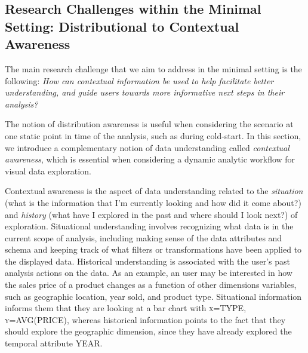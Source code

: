 \subsection{Research Challenges within the Minimal Setting: Distributional to Contextual Awareness}


\par The main research challenge that we aim to address in the minimal setting is the following: {\em How can contextual information be used to help facilitate better understanding, and guide users towards more informative next steps in their analysis?}

\par The notion of distribution awareness is useful when considering the scenario at one static point in time of the analysis, such as during cold-start. In this section, we introduce a complementary notion of data understanding called \textit{contextual awareness}, which is essential when considering a dynamic analytic workflow for visual data exploration.
\par Contextual awareness is the aspect of 
data understanding related to 
the \textit{situation} (what is the information 
that I'm currently looking and how did it come about?) 
and \textit{history} (what have I explored in the past 
and where should I look next?) of exploration. 
Situational understanding involves recognizing 
what data is in the current 
scope of analysis, 
including making sense of the data attributes 
and schema and keeping track of what filters or 
transformations have been applied to the displayed data. 
Historical understanding is associated with 
the user's past analysis actions on the data. 
As an example, an user may be interested 
in how the sales price of a product changes 
as a function of other dimensions variables, 
such as geographic location, year sold, and product type. 
Situational information informs them that they are 
looking at a bar chart with \textsc{x=TYPE}, \textsc{y=AVG(PRICE)}, 
whereas historical information points 
to the fact that they should explore the 
geographic dimension, since they have 
already explored the temporal attribute \textsc{YEAR}.

